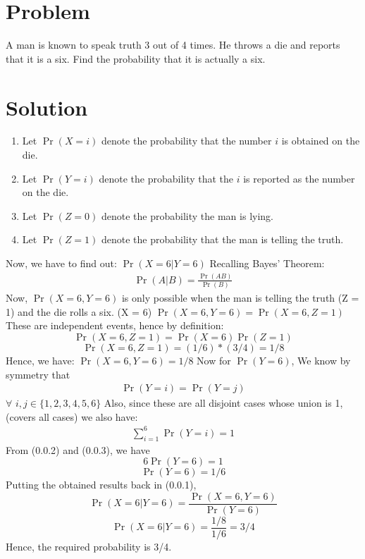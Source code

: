 \documentclass[journal,12pt,twocolumn]{IEEEtran}
\begin{document}
\section*{Problem}
A man is known to speak truth 3 out of 4 times. He throws a die and reports that it is a six. Find the probability that it is actually a six.
\section*{Solution}
\begin{enumerate}
    \item Let $\Pr(X=i)$ denote the probability that the number $i$ is obtained on the die.
    \newline \item Let $\Pr(Y=i)$ denote the probability that the $i$ is reported as the number on the die.
    \newline \item Let $\Pr(Z=0)$ denote the probability the man is lying.
    \newline \item Let $\Pr(Z=1)$ denote the probability that the man is telling the truth.
\end{enumerate}
Now, we have to find out: $\Pr(X=6|Y=6)$
\newline \newline Recalling Bayes' Theorem: 
\begin{eqnarray}
   \Pr(A|B)=\frac{\Pr(AB)}{\Pr(B)}    
\end{eqnarray}
\newline Now, $\Pr(X=6, Y=6)$ is only possible when the man is telling the truth (Z = 1) and the die rolls a six. (X = 6)
\newline \newline $\Pr(X=6, Y=6)=\Pr(X=6, Z=1)$
\newline These are independent events, hence by definition:
$$\Pr(X=6, Z=1)=\Pr(X=6)\Pr(Z=1) $$
$$\Pr(X=6, Z=1)=(1/6)*(3/4)=1/8 $$
Hence, we have: 
\newline $\Pr(X=6, Y=6)=1/8 $
\newline \newline Now for $\Pr(Y=6)$,
\newline We know by symmetry that 
\begin{eqnarray}
   \Pr(Y=i) = \Pr(Y=j)
\end{eqnarray}
$\forall$ $i,j \in \{ 1,2,3,4,5,6 \}$ 
\newline \newline Also, since these are all disjoint cases whose union is 1, (covers all cases) we also have:
\begin{eqnarray}
    \sum_{i=1}^{6} \Pr(Y=i) = 1 
\end{eqnarray}
\newline From (0.0.2) and (0.0.3), we have 
$$ 6\Pr(Y=6) = 1 $$
$$ \Pr(Y=6) = 1/6 $$
Putting the obtained results back in (0.0.1),
$$\Pr(X=6|Y=6) = \frac{\Pr(X=6, Y=6)}{\Pr(Y=6)} $$
$$\Pr(X=6|Y=6) = \frac{1/8}{1/6} = 3/4$$
Hence, the required probability is 3/4.
\end{document}
